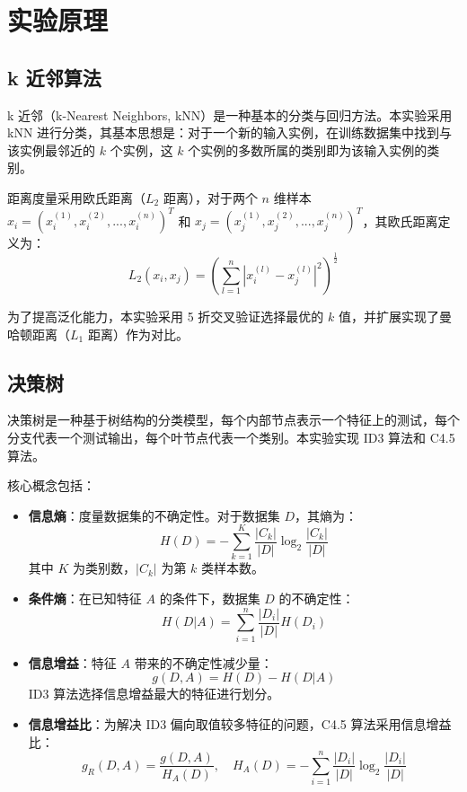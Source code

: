\documentclass{../common/SCNU_Experimental_Report}
\begin{document}
\maketitle

\section{实验原理}
\subsection{k 近邻算法}
k 近邻（k-Nearest Neighbors, kNN）是一种基本的分类与回归方法。本实验采用 kNN 进行分类，其基本思想是：对于一个新的输入实例，在训练数据集中找到与该实例最邻近的 \(k\) 个实例，这 \(k\) 个实例的多数所属的类别即为该输入实例的类别。

距离度量采用欧氏距离（\(L_2\) 距离），对于两个 \(n\) 维样本 \(x_i = (x_i^{(1)}, x_i^{(2)}, ..., x_i^{(n)})^T\) 和 \(x_j = (x_j^{(1)}, x_j^{(2)}, ..., x_j^{(n)})^T\)，其欧氏距离定义为：
\[
    L_2(x_i, x_j) = \left( \sum_{l=1}^n |x_i^{(l)} - x_j^{(l)}|^2 \right)^{\frac{1}{2}}
\]

为了提高泛化能力，本实验采用 5 折交叉验证选择最优的 \(k\) 值，并扩展实现了曼哈顿距离（\(L_1\) 距离）作为对比。

\subsection{决策树}
决策树是一种基于树结构的分类模型，每个内部节点表示一个特征上的测试，每个分支代表一个测试输出，每个叶节点代表一个类别。本实验实现 ID3 算法和 C4.5 算法。

核心概念包括：
\begin{itemize}
    \item \textbf{信息熵}：度量数据集的不确定性。对于数据集 \(D\)，其熵为：
          \[
              H(D) = -\sum_{k=1}^{K} \frac{|C_k|}{|D|} \log_2 \frac{|C_k|}{|D|}
          \]
          其中 \(K\) 为类别数，\(|C_k|\) 为第 \(k\) 类样本数。
    \item \textbf{条件熵}：在已知特征 \(A\) 的条件下，数据集 \(D\) 的不确定性：
          \[
              H(D|A) = \sum_{i=1}^{n} \frac{|D_i|}{|D|} H(D_i)
          \]
    \item \textbf{信息增益}：特征 \(A\) 带来的不确定性减少量：
          \[
              g(D, A) = H(D) - H(D|A)
          \]
          ID3 算法选择信息增益最大的特征进行划分。
    \item \textbf{信息增益比}：为解决 ID3 偏向取值较多特征的问题，C4.5 算法采用信息增益比：
          \[
              g_R(D, A) = \frac{g(D, A)}{H_A(D)}, \quad H_A(D) = -\sum_{i=1}^{n} \frac{|D_i|}{|D|} \log_2 \frac{|D_i|}{|D|}
          \]
\end{itemize}
\end{document}
